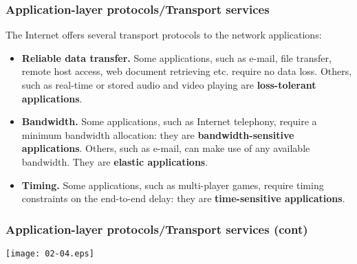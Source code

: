 %
\begin{frame}
\frametitle{Application-layer protocols/Transport services}

The Internet offers several transport protocols to the network
applications:
\begin{itemize}

  \item \textbf{Reliable data transfer.} Some applications, such as
  e-mail, file transfer, remote host access, web document retrieving
  etc. require no data loss. Others, such as real-time or stored audio
  and video playing are \textbf{loss-tolerant applications}.

  \item \textbf{Bandwidth.} Some applications, such as Internet
  telephony, require a minimum bandwidth allocation: they are
  \textbf{bandwidth-sensitive applications}. Others, such as e-mail,
  can make use of any available bandwidth. They are \textbf{elastic
    applications}.

  \item \textbf{Timing.} Some applications, such as multi-player
  games, require timing constraints on the end-to-end delay: they are
  \textbf{time-sensitive applications}.

\end{itemize}

\end{frame}

%
\begin{frame}
\frametitle{Application-layer protocols/Transport services (cont)}

\begin{center}
\texttt{[image: 02-04.eps]}
\end{center}

\end{frame}

